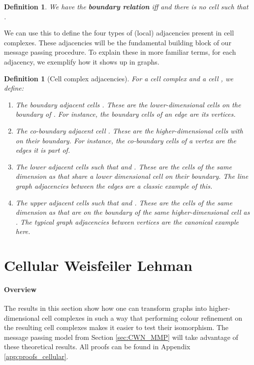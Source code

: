 \documentclass{article}
\newtheorem{definition}[theorem]{Definition}
\begin{document}
\begin{definition}
\label{def:boundary_rel}
We have the \textbf{boundary relation}  iff  and there is no cell  such that .
\end{definition}

We can use this to define the four types of (local) adjacencies present in cell complexes. These adjacencies will be the fundamental building block of our message passing procedure. To explain these in more familiar terms, for each adjacency, we exemplify how it shows up in graphs.   

\begin{definition}[Cell complex adjacencies]
\label{def:adj}
For a cell complex  and a cell , we define:
\begin{enumerate}[leftmargin=*, topsep=0pt,itemsep=-0.5ex]
    \item The boundary adjacent cells . These are the lower-dimensional cells on the boundary of . For instance, the boundary cells of an edge are its vertices.
    \item The co-boundary adjacent cell . These are the higher-dimensional cells with  on their boundary. For instance, the co-boundary cells of a vertex are the edges it is part of.
    \item The lower adjacent cells  such that  and . These are the cells of the same dimension as  that share a lower dimensional cell on their boundary. The line graph adjacencies between the edges are a classic example of this. 
    \item The upper adjacent cells  such that  and . These are the cells of the same dimension as  that are on the boundary of the same higher-dimensional cell as . The typical graph adjacencies between vertices are the canonical example here. 
\end{enumerate}
\end{definition}

\section{Cellular Weisfeiler Lehman}

\paragraph{Overview} The results in this section show how one can transform graphs into higher-dimensional cell complexes in such a way that performing colour refinement on the resulting cell complexes makes it easier to test their isomorphism. The message passing model from Section \ref{sec:CWN_MMP} will take advantage of these theoretical results. All proofs can be found in Appendix \ref{app:proofs_cellular}. 
\end{document}
